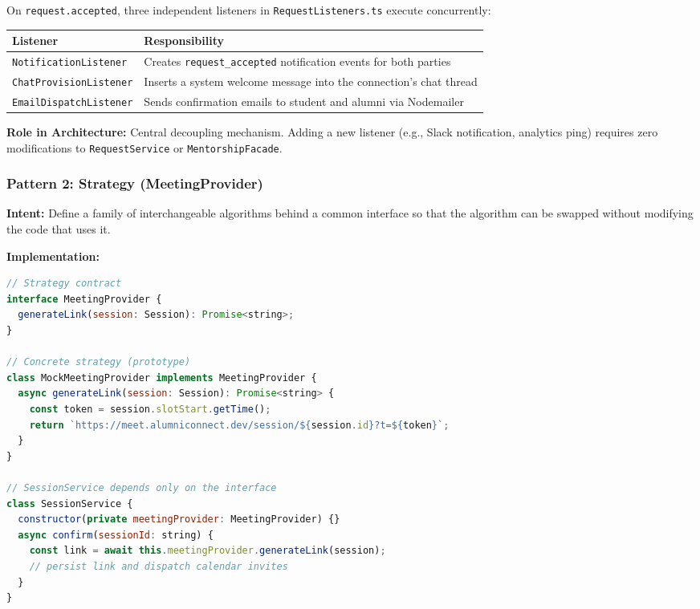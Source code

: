 \documentclass[12pt,a4paper]{article}
\begin{document}
On \texttt{request.accepted}, three independent listeners in \texttt{RequestListeners.ts} execute concurrently:

\begin{center}
\begin{tabular}{@{}p{4cm} p{8cm}@{}}
\toprule
\textbf{Listener} & \textbf{Responsibility} \\
\midrule
\texttt{NotificationListener} & Creates \texttt{request\_accepted} notification events for both parties \\
\texttt{ChatProvisionListener} & Inserts a system welcome message into the connection's chat thread \\
\texttt{EmailDispatchListener} & Sends confirmation emails to student and alumni via Nodemailer \\
\bottomrule
\end{tabular}
\end{center}

\textbf{Role in Architecture:} Central decoupling mechanism. Adding a new listener (e.g., Slack notification, analytics ping) requires zero modifications to \texttt{RequestService} or \texttt{MentorshipFacade}.

\vspace{1em}

\subsubsection{Pattern 2: Strategy (MeetingProvider)}

\textbf{Intent:} Define a family of interchangeable algorithms behind a common interface so that the algorithm can be swapped without modifying the code that uses it.

\textbf{Implementation:}

\begin{lstlisting}[language=JavaScript, caption={Strategy interface and concrete implementation in MeetingProvider.ts}]
// Strategy contract
interface MeetingProvider {
  generateLink(session: Session): Promise<string>;
}

// Concrete strategy (prototype)
class MockMeetingProvider implements MeetingProvider {
  async generateLink(session: Session): Promise<string> {
    const token = session.slotStart.getTime();
    return `https://meet.alumniconnect.dev/session/${session.id}?t=${token}`;
  }
}

// SessionService depends only on the interface
class SessionService {
  constructor(private meetingProvider: MeetingProvider) {}
  async confirm(sessionId: string) {
    const link = await this.meetingProvider.generateLink(session);
    // persist link and dispatch calendar invites
  }
}
\end{lstlisting}
\end{document}
